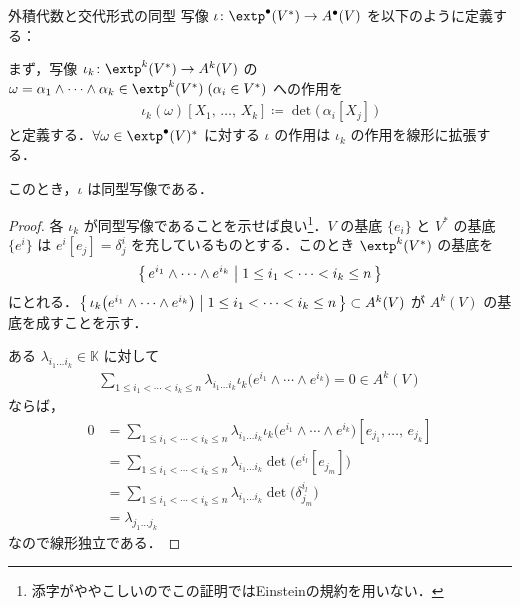 \documentclass[geometry_main]{subfiles}
\begin{document}
\begin{mytheo}[label=alghom]{外積代数と交代形式の同型}
	写像 $ \iota \colon \extp^\bullet (V^*) \to A^\bullet(V)$ を以下のように定義する：
	
	まず，写像 $ \iota_k \colon \extp^k (V^*) \to A^k(V)$ の $ \omega = \alpha_1 \wedge \cdots \wedge \alpha_k \in \extp^k (V^*) \; ( \alpha_i \in V^* )$ への作用を
	\begin{align}
		\iota_k( \omega )[X_1,\, \dots ,\, X_k] \coloneqq \det \bigl(\, \alpha_i [X_j] \, \bigr)
	\end{align}
	と定義する．$\forall \omega \in \extp^\bullet (V)^*$ に対する $ \iota $ の作用は $ \iota_k $ の作用を線形に拡張する．	

	このとき，$ \iota $ は同型写像である．
\end{mytheo}
\begin{proof}
	各 $ \iota_k $ が同型写像であることを示せば良い\footnote{添字がややこしいのでこの証明ではEinsteinの規約を用いない．}．$V$ の基底 $\{ e_i \}$ と $V^*$ の基底 $\{ e^i \}$ は $e^i[e_j] = \delta^i_j$ を充しているものとする．このとき $\extp^k (V^*)$ の基底を
	\begin{align} 
		\bigl\{\, e^{i_1} \wedge \cdots \wedge e^{i_k} \bigm| 1 \le i_1 < \cdots < i_k \le n \,\bigr\}
	\end{align}
	にとれる．$\bigl\{\, \iota_k \bigl( e^{i_1} \wedge \cdots \wedge e^{i_k} \bigr) \bigm| 1 \le i_1 < \cdots < i_k \le n \,\bigr\} \subset A^k(V)$ が $A^k(V)$ の基底を成すことを示す．
	
	ある $\lambda_{i_1 \dots i_k} \in \mathbb{K}$ に対して
	\begin{align} 
		\sum_{1 \le i_1 < \cdots < i_k \le n}\lambda_{i_1 \dots i_k} \iota_k \bigl( e^{i_1} \wedge \cdots \wedge e^{i_k} \bigr) = 0 \in A^k(V)
	\end{align}
	ならば，
	\begin{align} 
		0 &= \sum_{1 \le i_1 < \cdots < i_k \le n} \lambda_{i_1 \dots i_k} \iota_k \bigl( e^{i_1} \wedge \cdots \wedge e^{i_k} \bigr) [e_{j_1}, \dots ,\, e_{j_k}] \\
		&= \sum_{1 \le i_1 < \cdots < i_k \le n} \lambda_{i_1 \dots i_k} \det \bigl( e^{i_l}[e_{j_m}] \bigr) \\
		&= \sum_{1 \le i_1 < \cdots < i_k \le n} \lambda_{i_1 \dots i_k} \det \bigl( \delta^{i_l}_{j_m} \bigr) \\
		&= \lambda_{j_1 \dots j_k} 
	\end{align}
	なので線形独立である．
	

\end{proof}
\end{document}
